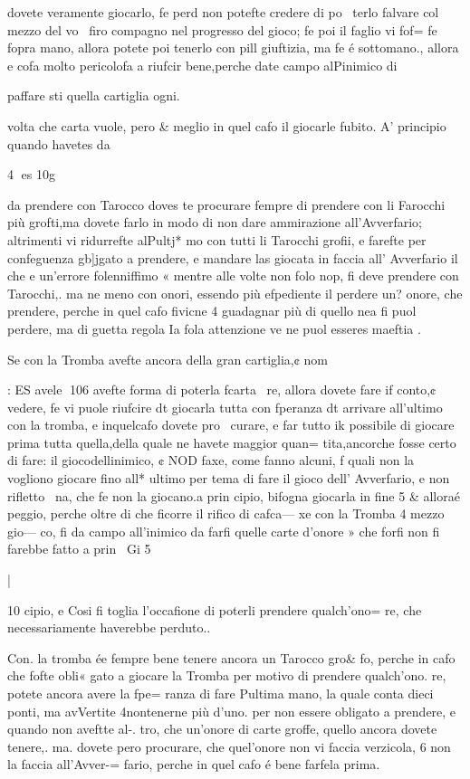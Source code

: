 \documentclass[11pt,a6paper]{article}
\begin{document}
dovete veramente giocarlo, fe
perd non potefte credere di po~
terlo falvare col mezzo del vo~
firo compagno nel progresso
del gioco; fe poi il faglio vi fof=
fe fopra mano, allora potete poi
tenerlo con pill giuftizia, ma fe
é sottomano., allora e cofa molto pericolofa a riufcir bene,perche date campo alPinimico di

 

paffare sti quella cartiglia ogni.

volta che carta vuole, pero &
meglio in quel cafo il giocarle
fubito.
A’ principio quando havetes
da

4
es
10g

da prendere con Tarocco doves
te procurare fempre di prendere con li Farocchi più grofti,ma
dovete farlo in modo di non dare ammirazione all’Avverfario;
altrimenti vi ridurrefte alPultj* mo con tutti li Tarocchi grofii,
e farefte per confeguenza gb]jgato a prendere, e mandare las
giocata in faccia all’ Avverfario
il che e un’errore folenniffimo «
mentre alle volte non folo nop,
fi deve prendere con Tarocchi,.
ma ne meno con onori, essendo
più efpediente il perdere un?
onore, che prendere, perche in
quel cafo fivicne 4 guadagnar
più di quello nea fi puol perdere, ma di guetta regola Ia fola
attenzione ve ne puol esseres
maeftia .

Se con la Tromba avefte ancora della gran cartiglia,¢ nom

: ES avele
106
avefte forma di poterla fcarta~
re, allora dovete fare if conto,¢
vedere, fe vi puole riufcire dt
giocarla tutta con fperanza dt
arrivare all’ultimo con la tromba, e inquelcafo dovete pro~
curare, e far tutto ik possibile di
giocare prima tutta quella,della
quale ne havete maggior quan=
tita,ancorche fosse certo di fare:
il giocodellinimico, ¢ NOD faxe, come fanno alcuni, f quali
non la vogliono giocare fino all*
ultimo per tema di fare il gioco
dell’ Avverfario, e non rifletto~ 
na, che fe non la giocano.a prin
cipio, bifogna giocarla in fine 5
& alloraé peggio, perche oltre
di che ficorre il rifico di cafca—
xe con la Tromba 4 mezzo gio—
co, fi da campo all’inimico da
farfi quelle carte d’onore » che
forfi non fi farebbe fatto a prin~
Gi 5

|
 

10
cipio, e Cosi fi toglia l’occafione
di poterli prendere qualch’ono=
re, che necessariamente haverebbe perduto..

Con. la tromba ée fempre bene
tenere ancora un Tarocco gro&
fo, perche in cafo che fofte obli«
gato a giocare la Tromba per
motivo di prendere qualch’ono.
re, potete ancora avere la fpe=
ranza di fare Pultima mano, la
quale conta dieci ponti, ma avVertite 4nontenerne più d’uno.
per non essere obligato a prendere, e quando non aveftte al-.
tro, che un’onore di carte groffe, quello ancora dovete tenere,.
ma. dovete pero procurare, che
quel’onore non vi faccia verzicola, 6 non la faccia all’Avver-=
fario, perche in quel cafo é bene farfela prima.
\end{document}
